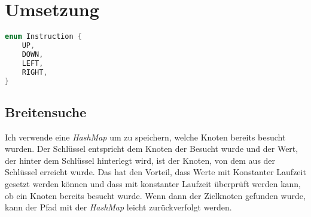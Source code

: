 \documentclass[a4paper,10pt,ngerman]{scrartcl}
\begin{document}
    \section{Umsetzung}
    \begin{lstlisting}[language=Rust]
enum Instruction {
    UP,
    DOWN,
    LEFT,
    RIGHT,
}

    \end{lstlisting}

    \subsection{Breitensuche}
    Ich verwende eine \textit{HashMap} um zu speichern, welche Knoten bereits besucht wurden. Der Schlüssel entspricht dem Knoten der Besucht wurde und der Wert, der hinter dem Schlüssel hinterlegt wird, ist der Knoten, von dem aus der Schlüssel erreicht wurde. Das hat den Vorteil, dass Werte mit Konstanter Laufzeit gesetzt werden können und dass mit konstanter Laufzeit überprüft werden kann, ob ein Knoten bereits besucht wurde.
    Wenn dann der Zielknoten gefunden wurde, kann der Pfad mit der \textit{HashMap} leicht zurückverfolgt werden.
    \begin{lstlisting}[language=Rust]
    \end{lstlisting}
\end{document}

